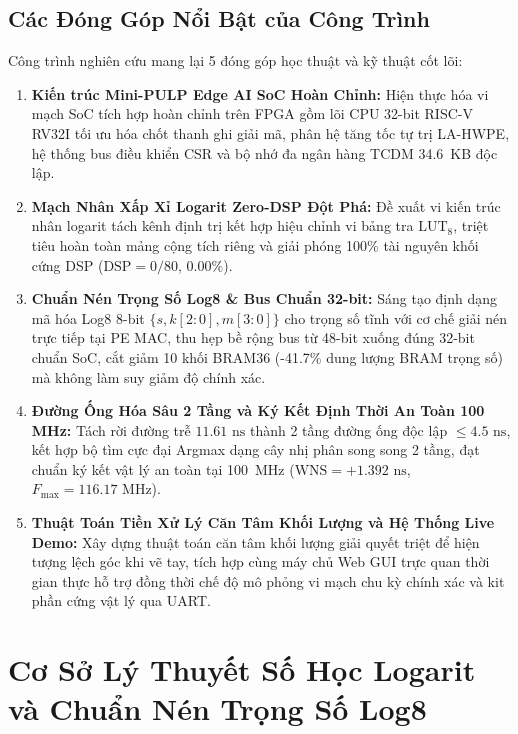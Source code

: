 \documentclass[conference]{IEEEtran}
\begin{document}
\subsection{Các Đóng Góp Nổi Bật của Công Trình}
\hspace*{1em} Công trình nghiên cứu mang lại 5 đóng góp học thuật và kỹ thuật cốt lõi:
\begin{enumerate}
    \item \textbf{Kiến trúc Mini-PULP Edge AI SoC Hoàn Chỉnh:} Hiện thực hóa vi mạch SoC tích hợp hoàn chỉnh trên FPGA gồm lõi CPU 32-bit RISC-V RV32I tối ưu hóa chốt thanh ghi giải mã, phân hệ tăng tốc tự trị LA-HWPE, hệ thống bus điều khiển CSR và bộ nhớ đa ngân hàng TCDM 34.6~KB độc lập.
    \item \textbf{Mạch Nhân Xấp Xỉ Logarit Zero-DSP Đột Phá:} Đề xuất vi kiến trúc nhân logarit tách kênh định trị kết hợp hiệu chỉnh vi bảng tra $\text{LUT}_8$, triệt tiêu hoàn toàn mảng cộng tích riêng và giải phóng 100\% tài nguyên khối cứng DSP ($\text{DSP} = 0/80$, $0.00\%$).
    \item \textbf{Chuẩn Nén Trọng Số Log8 \& Bus Chuẩn 32-bit:} Sáng tạo định dạng mã hóa Log8 8-bit $\{s, k[2:0], m[3:0]\}$ cho trọng số tĩnh với cơ chế giải nén trực tiếp tại PE MAC, thu hẹp bề rộng bus từ 48-bit xuống đúng 32-bit chuẩn SoC, cắt giảm 10 khối BRAM36 (-41.7\% dung lượng BRAM trọng số) mà không làm suy giảm độ chính xác.
    \item \textbf{Đường Ống Hóa Sâu 2 Tầng và Ký Kết Định Thời An Toàn 100 MHz:} Tách rời đường trễ $11.61\text{ ns}$ thành 2 tầng đường ống độc lập $\le 4.5\text{ ns}$, kết hợp bộ tìm cực đại Argmax dạng cây nhị phân song song 2 tầng, đạt chuẩn ký kết vật lý an toàn tại 100~MHz ($\text{WNS} = +1.392\text{ ns}$, $F_{\max} = 116.17\text{ MHz}$).
    \item \textbf{Thuật Toán Tiền Xử Lý Căn Tâm Khối Lượng và Hệ Thống Live Demo:} Xây dựng thuật toán căn tâm khối lượng giải quyết triệt để hiện tượng lệch góc khi vẽ tay, tích hợp cùng máy chủ Web GUI trực quan thời gian thực hỗ trợ đồng thời chế độ mô phỏng vi mạch chu kỳ chính xác và kit phần cứng vật lý qua UART.
\end{enumerate}

\section{Cơ Sở Lý Thuyết Số Học Logarit và Chuẩn Nén Trọng Số Log8}
\label{sec:theory_log8}
\end{document}
